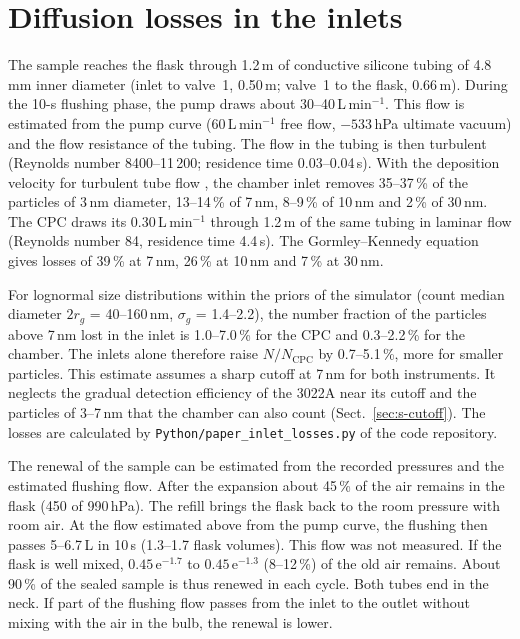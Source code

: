\documentclass[12pt]{article}
\begin{document}
\clearpage
\section{Diffusion losses in the inlets}
\label{sec:s-losses}
The sample reaches the flask through 1.2\,m of conductive silicone tubing of 4.8\,mm inner diameter
(inlet to valve~1, 0.50\,m; valve~1 to the flask, 0.66\,m). During the 10-s flushing phase, the pump draws
about 30--40\,L\,min$^{-1}$. This flow is estimated from the pump curve (60\,L\,min$^{-1}$ free flow,
$-533$\,hPa ultimate vacuum) and the flow resistance of the tubing. The flow in the tubing is then turbulent
(Reynolds number
8400--11\,200; residence time 0.03--0.04\,s). With the deposition velocity for turbulent tube flow
\citep[Eqs.~7.31--7.32]{hinds1999aerosol}, the chamber inlet removes 35--37\,\% of the particles of
3\,nm diameter, 13--14\,\% of 7\,nm, 8--9\,\% of 10\,nm and 2\,\% of 30\,nm. The CPC draws its
0.30\,L\,min$^{-1}$
through 1.2\,m of the same tubing in laminar flow (Reynolds number 84, residence time 4.4\,s).
The Gormley--Kennedy equation \citep[Eq.~7.29]{hinds1999aerosol} gives losses of 39\,\% at 7\,nm, 26\,\% at
10\,nm and 7\,\% at 30\,nm.

For lognormal size distributions within the priors of the simulator (count median diameter $2r_g$ =
40--160\,nm, $\sigma_g$ = 1.4--2.2), the number fraction of the particles above 7\,nm lost in the inlet
is 1.0--7.0\,\% for the CPC and 0.3--2.2\,\% for the chamber. The inlets alone
therefore raise $N/N_\mathrm{CPC}$ by 0.7--5.1\,\%, more for smaller particles.
This estimate assumes a sharp cutoff at 7\,nm for both instruments. It neglects the gradual
detection efficiency of the 3022A near its cutoff and the particles of 3--7\,nm that the chamber
can also count (Sect.~\ref{sec:s-cutoff}). The losses are calculated by
\texttt{Python/\allowbreak paper\_\allowbreak inlet\_\allowbreak losses.py} of the code repository.

The renewal of the sample can be estimated from the recorded pressures and the estimated flushing
flow. After the expansion about 45\,\% of the air remains in the flask (450 of 990\,hPa). The refill
brings the flask back to the room pressure with room air. At the flow estimated above from the pump curve,
the flushing then passes 5--6.7\,L in 10\,s (1.3--1.7 flask volumes). This flow was not measured. If the
flask is well mixed, $0.45\,\mathrm{e}^{-1.7}$ to $0.45\,\mathrm{e}^{-1.3}$ (8--12\,\%) of the old air
remains. About 90\,\% of the sealed sample is thus renewed in each cycle. Both tubes end in the
neck. If part of the flushing flow passes from the inlet to the outlet without mixing with the air in
the bulb, the renewal is lower.



\end{document}
